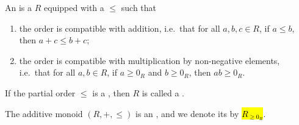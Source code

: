 \begin{definition} \label{definition:ordered_semiring}
    An  is a  $R$ equipped with a  $\leq$ such that
    \begin{enumerate}
        \item the order is compatible with addition, i.e.\ that for all $a,b,c \in R$, if $a \leq b$, then $a + c \leq b + c$;
        \item the order is compatible with multiplication by non-negative elements, i.e.\ that for all $a,b \in R$, if $a \ge 0_R$ and $b \ge 0_R$, then $ab \ge 0_R$.
    \end{enumerate}
    If the partial order $\leq$ is a , then $R$ is called a .

    The additive monoid $(R,+,\leq)$ is an , and we denote its  by \hl{$R_{\ge 0_R}$}.
\end{definition}